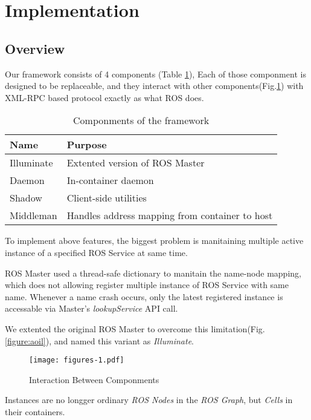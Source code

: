 \section{Implementation}

\subsection{Overview}

Our framework consists of 4 components (Table \ref{table:componments}),
Each of those componment is designed to be replaceable, and they interact with
other components(Fig.\ref{figure:aoss}) with XML-RPC based protocol exactly as
what ROS does.

\begin{table}[H]
  \renewcommand{\arraystretch}{1.3}
  \caption{Componments of the framework}
  \label{table:componments}
  \centering
  \begin{tabular}{ll}
     \hline
     \bfseries Name & \bfseries Purpose \\
     \hline
     Illuminate & Extented version of ROS Master \\ 
     Daemon     & In-container daemon \\
     Shadow     & Client-side utilities \\
     Middleman  & Handles address mapping from container to host \\
     \hline
  \end{tabular}
\end{table} 

To implement above features, the biggest problem is manitaining multiple active
instance of a specified ROS Service at same time.

ROS Master used a thread-safe dictionary to manitain the name-node mapping,
which does not allowing register multiple instance of ROS Service with same name.
Whenever a name crash occurs, only the latest registered instance is
accessable via Master's \emph{lookupService} API call.

We extented the original ROS Master to overcome this
limitation(Fig.\ref{figure:aoil}), and named this variant as \emph{Illuminate}.

\begin{figure}[!t]
\centering
\texttt{[image: figures-1.pdf]}
\caption{Interaction Between Componments}
\label{figure:aoss}
\end{figure}

Instances are no longger ordinary \emph{ROS Nodes} in the \emph{ROS Graph},
but \emph{Cells} in their containers.

